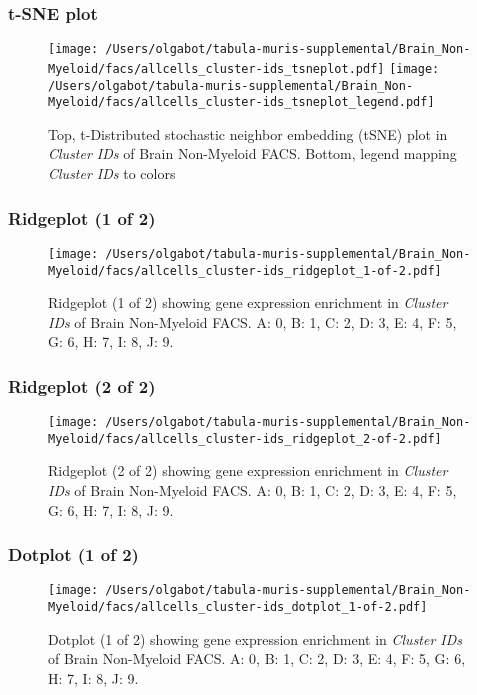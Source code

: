 \clearpage
\subsubsection{t-SNE plot}
\begin{figure}[h]
\centering
\texttt{[image: /Users/olgabot/tabula-muris-supplemental/Brain\_Non-Myeloid/facs/allcells\_cluster-ids\_tsneplot.pdf]}
\texttt{[image: /Users/olgabot/tabula-muris-supplemental/Brain\_Non-Myeloid/facs/allcells\_cluster-ids\_tsneplot\_legend.pdf]}
\caption{Top, t-Distributed stochastic neighbor embedding (tSNE) plot  in \emph{Cluster IDs} of Brain Non-Myeloid FACS. Bottom, legend mapping \emph{Cluster IDs} to colors}
\end{figure}


\clearpage
\subsubsection{Ridgeplot (1 of 2)}
\begin{figure}[h]
\centering
\texttt{[image: /Users/olgabot/tabula-muris-supplemental/Brain\_Non-Myeloid/facs/allcells\_cluster-ids\_ridgeplot\_1-of-2.pdf]}

\caption{ Ridgeplot (1 of 2)  showing gene expression enrichment in \emph{Cluster IDs} of Brain Non-Myeloid FACS. A: 0, B: 1, C: 2, D: 3, E: 4, F: 5, G: 6, H: 7, I: 8, J: 9.}
\end{figure}


\clearpage
\subsubsection{Ridgeplot (2 of 2)}
\begin{figure}[h]
\centering
\texttt{[image: /Users/olgabot/tabula-muris-supplemental/Brain\_Non-Myeloid/facs/allcells\_cluster-ids\_ridgeplot\_2-of-2.pdf]}

\caption{ Ridgeplot (2 of 2)  showing gene expression enrichment in \emph{Cluster IDs} of Brain Non-Myeloid FACS. A: 0, B: 1, C: 2, D: 3, E: 4, F: 5, G: 6, H: 7, I: 8, J: 9.}
\end{figure}


\clearpage
\subsubsection{Dotplot (1 of 2)}
\begin{figure}[h]
\centering
\texttt{[image: /Users/olgabot/tabula-muris-supplemental/Brain\_Non-Myeloid/facs/allcells\_cluster-ids\_dotplot\_1-of-2.pdf]}

\caption{ Dotplot (1 of 2)  showing gene expression enrichment in \emph{Cluster IDs} of Brain Non-Myeloid FACS. A: 0, B: 1, C: 2, D: 3, E: 4, F: 5, G: 6, H: 7, I: 8, J: 9.}
\end{figure}


